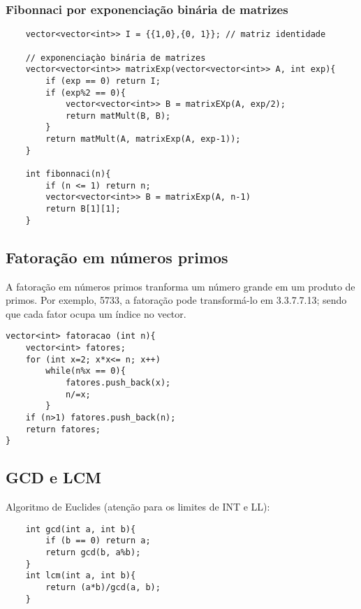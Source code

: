 \subsubsection{Fibonnaci por exponenciação binária de matrizes}

\begin{verbatim}
    vector<vector<int>> I = {{1,0},{0, 1}}; // matriz identidade

    // exponenciaçào binária de matrizes
    vector<vector<int>> matrixExp(vector<vector<int>> A, int exp){
        if (exp == 0) return I;
        if (exp%2 == 0){
            vector<vector<int>> B = matrixEXp(A, exp/2);
            return matMult(B, B);
        }
        return matMult(A, matrixExp(A, exp-1));
    }

    int fibonnaci(n){
        if (n <= 1) return n;
        vector<vector<int>> B = matrixExp(A, n-1)
        return B[1][1];
    }
\end{verbatim}

\subsection{Fatoração em números primos}
A fatoração em números primos tranforma um número grande em um produto de primos. Por exemplo, 5733, a fatoração pode transformá-lo em 3.3.7.7.13; sendo que cada fator ocupa um índice no vector.
    \begin{verbatim}
vector<int> fatoracao (int n){
    vector<int> fatores;
    for (int x=2; x*x<= n; x++)
        while(n%x == 0){
            fatores.push_back(x);
            n/=x;
        }
    if (n>1) fatores.push_back(n);
    return fatores;
}
\end{verbatim}

\subsection{GCD e LCM}
\par Algoritmo de Euclides (atenção para os limites de INT e LL):
\begin{verbatim}
    int gcd(int a, int b){
        if (b == 0) return a;
        return gcd(b, a%b);
    }
    int lcm(int a, int b){
        return (a*b)/gcd(a, b);
    }
\end{verbatim}

